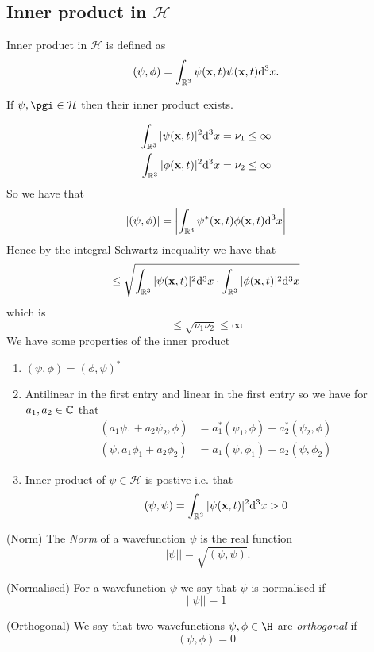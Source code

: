 \documentclass{article}
\begin{document}
\subsection{Inner product in $ \mathcal H $}
\begin{definition}
  Inner product in $ \mathcal H $ is defined as
  \[
	  (\psi,\phi)=\int_{\mathbb{R}^3}\psi(\mathbf x,t)\psi(\mathbf x,t)\mathrm d^3x.
  \]
\end{definition}
\begin{theorem}
  If $ \psi,\pgi\in\mathcal H $ then their inner product exists.
\end{theorem}
\pf
\begin{align*}
	\int_{\mathbb{R}^3}|\psi(\mathbf x,t)|^2\mathrm d^3x=\nu_1\le\infty \\		\int_{\mathbb{R}^3}|\phi(\mathbf x,t)|^2\mathrm d^3x=\nu_2\le\infty 
\end{align*}
So we have that
\[
	|(\psi,\phi)|=\left|\int_{\mathbb{R}^3}\psi^*(\mathbf x,t)\phi(\mathbf x,t)\mathrm d^3x\right|
\]
Hence by the integral Schwartz inequality we have that
\[
	\le\sqrt{\int_{\mathbb{R}^3}|\psi(\mathbf x,t)|^2\mathrm d^3x\cdot \int_{\mathbb{R}^3}|\phi(\mathbf x,t)|^2\mathrm d^3x}
\]
which is
\[
	\le \sqrt{\nu_1\nu_2}\le\infty
\]
We have some properties of the inner product
\begin{enumerate}
	\item $ (\psi,\phi)=(\phi,\psi)^*$
	\item Antilinear in the first entry and linear in the first entry so we have for $ a_1,a_2\in \mathbb{C} $ that
		\begin{align*}
			(a_1\psi_1+a_2\psi_2,\phi)&=a_1^*(\psi_1,\phi)+a_2^*(\psi_2,\phi)\\
			(\psi,a_1\phi_1+a_2\phi_2)&=a_1(\psi,\phi_1)+a_2(\psi,\phi_2)
		\end{align*}
	\item Inner product of $ \psi\in\mathcal H $ is postive i.e. that
		\[
			(\psi,\psi)=\int_{\mathbb{R}^3}|\psi(\mathbf x,t)|^2\mathrm d^3x>0
		\]
\end{enumerate}
\begin{definition}
	(Norm) The \textit{Norm} of a wavefunction $ \psi $ is the real function
	\[
		||\psi||=\sqrt{(\psi,\psi)}.
	\]
\end{definition}
\begin{definition}
	(Normalised) For a wavefunction $ \psi $ we say that $ \psi $ is normalised if
	\[
	  ||\psi||=1
	\]
\end{definition}
\begin{definition}
	(Orthogonal) We say that two wavefunctions $ \psi,\phi\in\H $ are \textit{orthogonal} if
	\[
		(\psi,\phi)=0
	\]
\end{definition}
\end{document}
